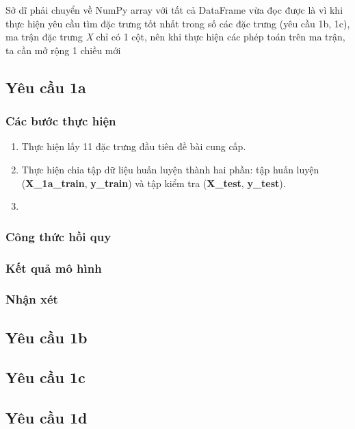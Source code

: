 \documentclass[]{article}
\begin{document}
Sở dĩ phải chuyển về NumPy array với tất cả DataFrame vừa đọc được là vì khi thực hiện yêu cầu tìm đặc trưng tốt nhất trong số các đặc trưng (yêu cầu 1b, 1c), ma trận đặc trưng \textit{X} chỉ có 1 cột, nên khi thực hiện các phép toán trên ma trận, ta cần mở rộng 1 chiều mới 

\subsection{Yêu cầu 1a}
\subsubsection{Các bước thực hiện}
\begin{enumerate}
  \item Thực hiện lấy 11 đặc trưng đầu tiên đề bài cung cấp.
  \item Thực hiện chia tập dữ liệu huấn luyện thành hai phần: tập huấn luyện (\textbf{X\_1a\_train}, \textbf{y\_train}) và tập kiểm tra (\textbf{X\_test}, \textbf{y\_test}).
  \item 
\end{enumerate}
\subsubsection{Công thức hồi quy}
\subsubsection{Kết quả mô hình}
\subsubsection{Nhận xét}

\subsection{Yêu cầu 1b}

\subsection{Yêu cầu 1c}

\subsection{Yêu cầu 1d}

\newpage
\printbibliography[heading=mybibintoc]
\end{document}
